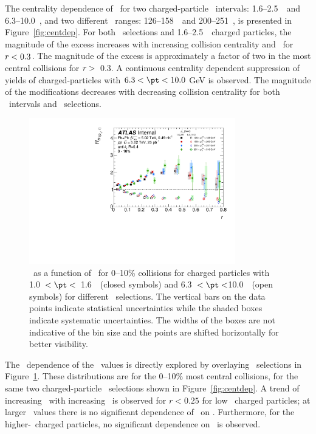 The centrality dependence of \RDptr\ for two charged-particle \pt\ intervals: 1.6--2.5~\GeV\ and \mbox{6.3--10.0~\GeV}, and two different \ptjet\ ranges: 126--158~\GeV\ and 200--251~\GeV, is presented in Figure~\ref{fig:centdep}. 
For both \ptjet\ selections and  1.6--2.5~\GeV\ charged particles, the magnitude of the excess increases
with increasing collision centrality and \rvar\ for $\mbox{$r$} < 0.3$.  The magnitude of the excess is
approximately a factor of two in the most central collisions for $\mbox{$r$} >$~0.3.
A continuous centrality dependent suppression of  yields of charged-particles with $6.3 < \pt < 10.0$ GeV is observed.
The magnitude of the modifications decreases with decreasing collision centrality for both \pt\ 
intervals and \ptjet\ selections.

\begin{figure}[ht]
\centerline{
\includegraphics[width=0.8\textwidth]{figures/results/RDpT_dR_trk3_trk6_cent0.pdf} 
}
\caption{\RDptr\ as a function of \rvar\ for 0--10\% collisions for charged particles with 1.0~$< \pt <$~1.6~\GeV\
(closed symbols) and 6.3~$< \pt <$10.0~\GeV\ (open symbols) for different \ptjet\ selections. The vertical bars on the data points indicate statistical uncertainties while the shaded boxes indicate systematic uncertainties. The widths of the boxes are not indicative of the bin size and the points are shifted horizontally for better visibility.}
\label{fig:ptjetdep}
\end{figure}


The \ptjet\ dependence of the \RDptr\ values is directly explored by overlaying 
\ptjet\ selections in Figure~\ref{fig:ptjetdep}. These distributions are for the 0--10\% 
most central collisions, for the same two charged-particle \pt\ selections shown in Figure~\ref{fig:centdep}. 
  A trend of increasing \RDptr\ with increasing \ptjet\ is observed for $r < 0.25$ for low 
\pt\ charged particles; at larger \rvar\ values there is no significant dependence of \RDptr\ on \ptjet. 
Furthermore, for the higher-\pt\ charged particles, no significant dependence on \ptjet\ is observed. 


